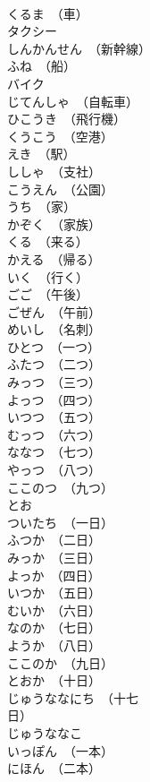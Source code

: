 \documentclass[8pt]{extreport}
\begin{document}
\begin{CJK}{UTF8}{min}
\\	くるま　（車）	
\\	タクシー	
\\	しんかんせん　（新幹線）	
\\	ふね　（船）	
\\	バイク	
\\	じてんしゃ　（自転車）	
\\	ひこうき　（飛行機）	
\\	くうこう　（空港）	
\\	えき　（駅）	
\\	ししゃ　（支社）	
\\	こうえん　（公園）	
\\	うち　（家）	
\\	かぞく　（家族）	
\\	くる　（来る）	
\\	かえる　（帰る）	
\\	いく　（行く）	
\\	ごご　（午後）	
\\	ごぜん　（午前）	
\\	めいし　（名刺）	
\\	ひとつ　（一つ）	
\\	ふたつ　（二つ）	
\\	みっつ　（三つ）	
\\	よっつ　（四つ）	
\\	いつつ　（五つ）	
\\	むっつ　（六つ）	
\\	ななつ　（七つ）	
\\	やっつ　（八つ）	
\\	ここのつ　（九つ）	
\\	とお	
\\	ついたち　（一日）	
\\	ふつか　（二日）	
\\	みっか　（三日）	
\\	よっか　（四日）	
\\	いつか　（五日）	
\\	むいか　（六日）	
\\	なのか　（七日）	
\\	ようか　（八日）	
\\	ここのか　（九日）	
\\	とおか　（十日）	
\\	じゅうななにち　（十七
\\	日）	
\\	じゅうななこ	
\\	いっぽん　（一本）	
\\	にほん　（二本）	

\end{CJK}
\end{document}
